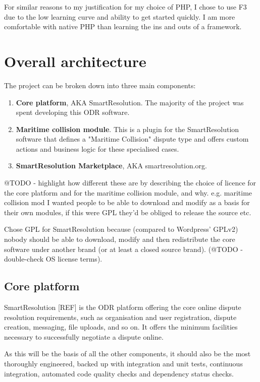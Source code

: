 For similar reasons to my justification for my choice of PHP, I chose to use F3 due to the low learning curve and ability to get started quickly. I am more comfortable with native PHP than learning the ins and outs of a framework.

\section{Overall architecture}

The project can be broken down into three main components:

\begin{enumerate}
    \item \textbf{Core platform}, AKA SmartResolution. The majority of the project was spent developing this ODR software.
    
    \item \textbf{Maritime collision module}. This is a plugin for the SmartResolution software that defines a "Maritime Collision" dispute type and offers custom actions and business logic for these specialised cases.
    
    \item \textbf{SmartResolution Marketplace}, AKA smartresolution.org. 
\end{enumerate}

@TODO - highlight how different these are by describing the choice of licence for the core platform and for the maritime collision module, and why. e.g. maritime collision mod I wanted people to be able to download and modify as a basis for their own modules, if this were GPL they'd be obliged to release the source etc.

Chose GPL for SmartResolution because (compared to Wordpress' GPLv2) nobody should be able to download, modify and then redistribute the core software under another brand (or at least a closed source brand). (@TODO - double-check OS license terms).

\subsection{Core platform}

SmartResolution [REF] is the ODR platform offering the core online dispute resolution requirements, such as organisation and user registration, dispute creation, messaging, file uploads, and so on. It offers the minimum facilities necessary to successfully negotiate a dispute online.

As this will be the basis of all the other components, it should also be the most thoroughly engineered, backed up with integration and unit tests, continuous integration, automated code quality checks and dependency status checks.

